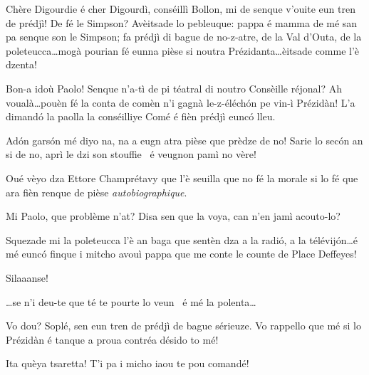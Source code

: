 \begin{drama}

\Dallasspeaks Chère Digourdie é cher Digourdì, conséillì Bollon, mi de senque v'ouite eun tren de prédjì! De fé le Simpson? Avèitsade lo pebleuque: pappa é mamma de mé san pa senque son le Simpson; fa prédjì di bague de no-z-atre, de la Val d'Outa, de la poleteucca\ldots mogà pourian fé eunna pièse si noutra Prézidanta\ldots èitsade comme l'è dzenta!

\Presidanspeaks Bon-a idoù Paolo! Senque n'a-tì de pi téatral di noutro Consèille réjonal? Ah voualà\ldots pouèn fé la conta de comèn n'i gagnà le-z-éléch\'on pe vin-ì Prézidàn!  L’a dimand\'o la paolla la conséilliye Comé é fièn prédjì eunc\'o lleu.

\Sophiespeaks Ad\'on gars\'on mé diyo na, na a eugn atra pièse que prèdze de no! Sarie lo sec\'on an si de no, aprì le dzi son stouffie \stufo\ é veugnon pamì no vère!

\Cimaspeaks Oué vèyo dza Ettore Champrétavy que l'è seuilla  que no fé la morale si lo fé que ara fièn renque de pièse \textit{autobiographique}.

\Joellespeaks Mi Paolo, que problème n'at? Disa sen que la voya, can n'en jamì acouto-lo?


\Eyviaspeaks Squezade mi la poleteucca l'è an baga que sentèn dza a la radi\'o, a la télévij\'on\ldots é mé eunc\'o finque i mitcho avouì pappa que me conte le counte de Place Deffeyes!


\Presidanspeaks{} Silaaanse! 


\Secreteospeaks \ldots se n'i deu-te que té te pourte lo veun \wine\ é mé la polenta\ldots


\Presidanspeaks Vo dou? Soplé, sen eun tren de prédjì de bague sérieuze.  Vo rappello que mé si lo Prézidàn é tanque a proua contréa désido to mé!

\Marcospeaks Ita quèya tsaretta! T'i pa i micho iaou te pou comandé!


\end{drama}
